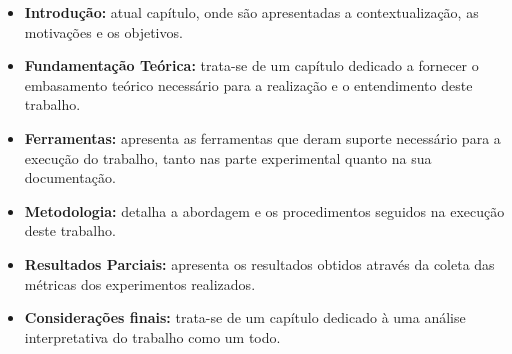 \begin{itemize}
\item \textbf{Introdução:} atual capítulo, onde são apresentadas a contextualização, as motivações e os objetivos. 
\item \textbf{Fundamentação Teórica:} trata-se de um capítulo dedicado a fornecer o embasamento teórico necessário para a realização e o entendimento deste trabalho.
\item \textbf{Ferramentas:} apresenta as ferramentas que deram suporte necessário para a execução do trabalho, tanto nas parte experimental quanto na sua documentação.
\item \textbf{Metodologia:} detalha a abordagem e os procedimentos seguidos na execução deste trabalho.
\item \textbf{Resultados Parciais:} apresenta os resultados obtidos através da coleta das métricas dos experimentos realizados.
\item \textbf{Considerações finais:} trata-se de um capítulo dedicado à uma análise interpretativa do trabalho como um todo.
\end{itemize}
